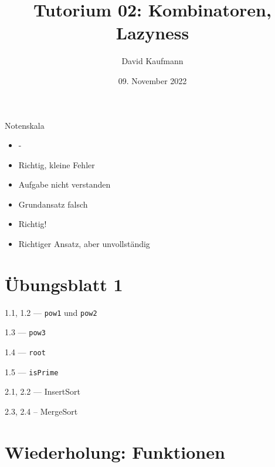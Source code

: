 \documentclass{beamer}
\title{Tutorium 02: Kombinatoren, Lazyness}
\author{David Kaufmann}
\institute{Tutorium Programmierparadigmen am KIT}
\date{09. November 2022}
\begin{document}
\begin{frame}
	\titlepage
\end{frame}

\begin{frame}{Notenskala}
	\begin{itemize}
		\item -
		\item Richtig, kleine Fehler
		\item Aufgabe nicht verstanden
		\item Grundansatz falsch
		\item Richtig!
		\item Richtiger Ansatz, aber unvollständig
	\end{itemize}
\end{frame}

\section{Übungsblatt 1}

\begin{frame}{1.1, 1.2 --- \texttt{pow1} und \texttt{pow2}}
\end{frame}

\begin{frame}{1.3 --- \texttt{pow3}}
\end{frame}

\begin{frame}{1.4 --- \texttt{root}}
\end{frame}

\begin{frame}{1.5 --- \texttt{isPrime}}
\end{frame}

\begin{frame}{2.1, 2.2 --- InsertSort}
\end{frame}

\begin{frame}{2.3, 2.4 -- MergeSort}
\end{frame}

\section{Wiederholung: Funktionen}
\end{document}
